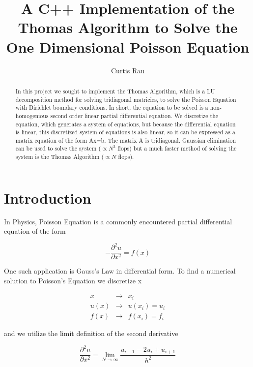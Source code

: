 \documentclass[twocolumn, groupedaddress]{revtex4-1}
\begin{document}
\title{A C++ Implementation of the Thomas Algorithm to Solve the One Dimensional Poisson Equation}

\author{Curtis Rau}

\begin{abstract}
In this project we sought to implement the Thomas Algorithm, which is a LU decomposition method for solving tridiagonal matricies, to solve the Poisson Equation with Dirichlet boundary conditions.  In short, the equation to be solved is a non-homogenious second order linear partial differential equation.  We discretize the equation, which generates a system of equations, but because the differential equation is linear, this discretized system of equations is also linear, so it can be expressed as a matrix equation of the form Ax=b.  The matrix A is tridiagonal.  Gaussian elimination can be used to solve the system ($\propto N^3$ flops) but a much faster method of solving the system is the Thomas Algorithm ($\propto N$ flops). \citep{morten}
\end{abstract}

\maketitle


\section{Introduction}
In Physics, Poisson Equation is a commonly encountered partial differential equation of the form

\begin{equation}
	- \frac{\partial^2 u}{\partial x^2} = f(x)
\end{equation}

One such application is Gauss’s Law in differential form.  To find a numerical solution to Poisson’s Equation we discretize x

\begin{equation}
\begin{aligned}
	x    &\to & x_i          \\
	u(x) &\to & u(x_i) = u_i \\
	f(x) &\to & f(x_i) = f_i
\end{aligned}
\end{equation}

and we utilize the limit definition of the second derivative

\begin{equation}
	\frac{\partial^2 u}{\partial x^2} = \lim_{N \to \infty} \frac{u_{i-1} - 2 u_i + u_{i+1}}{h^2}
\end{equation}
\end{document}
